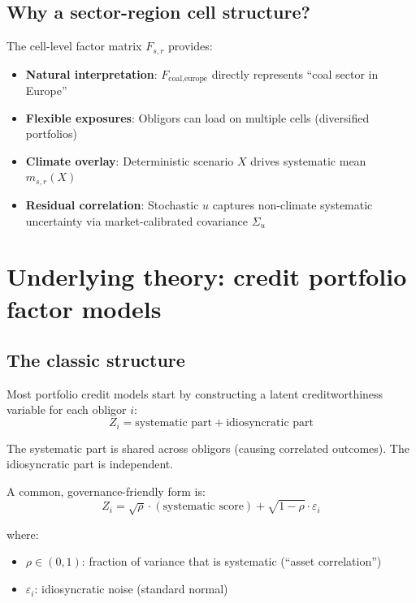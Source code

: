 \documentclass[11pt,a4paper]{article}
\begin{document}
\subsection{Why a sector-region cell structure?}

The cell-level factor matrix $F_{s,r}$ provides:
\begin{itemize}
    \item \textbf{Natural interpretation}: $F_{\text{coal,europe}}$ directly represents ``coal sector in Europe''
    \item \textbf{Flexible exposures}: Obligors can load on multiple cells (diversified portfolios)
    \item \textbf{Climate overlay}: Deterministic scenario $X$ drives systematic mean $m_{s,r}(X)$
    \item \textbf{Residual correlation}: Stochastic $u$ captures non-climate systematic uncertainty via market-calibrated covariance $\Sigma_u$
\end{itemize}

\section{Underlying theory: credit portfolio factor models}

\subsection{The classic structure}

Most portfolio credit models start by constructing a latent creditworthiness variable for each obligor $i$:
\begin{equation}
Z_i = \text{systematic part} + \text{idiosyncratic part}
\end{equation}

The systematic part is shared across obligors (causing correlated outcomes). The idiosyncratic part is independent.

A common, governance-friendly form is:
\begin{equation}
Z_i = \sqrt{\rho} \cdot (\text{systematic score}) + \sqrt{1-\rho} \cdot \varepsilon_i
\end{equation}

where:
\begin{itemize}
    \item $\rho \in (0,1)$: fraction of variance that is systematic (``asset correlation'')
    \item $\varepsilon_i$: idiosyncratic noise (standard normal)
\end{itemize}
\end{document}
